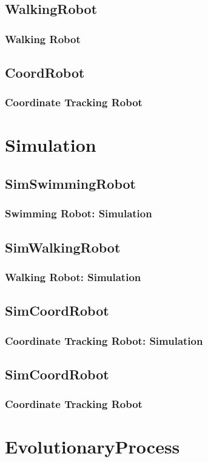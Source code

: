 \documentclass{beamer}
\begin{document}
\subsection{WalkingRobot}
\begin{frame}
  \frametitle{Walking Robot}
\end{frame}

\subsection{CoordRobot}
\begin{frame}
  \frametitle{Coordinate Tracking Robot}
\end{frame}

\section{Simulation}

\subsection{SimSwimmingRobot}
\begin{frame}
  \frametitle{Swimming Robot: Simulation}
\end{frame}

\subsection{SimWalkingRobot}
\begin{frame}
  \frametitle{Walking Robot: Simulation}
\end{frame}

\subsection{SimCoordRobot}
\begin{frame}
  \frametitle{Coordinate Tracking Robot: Simulation}
\end{frame}

\subsection{SimCoordRobot}
\begin{frame}
  \frametitle{Coordinate Tracking Robot}
\end{frame}

\section{EvolutionaryProcess}
\end{document}
